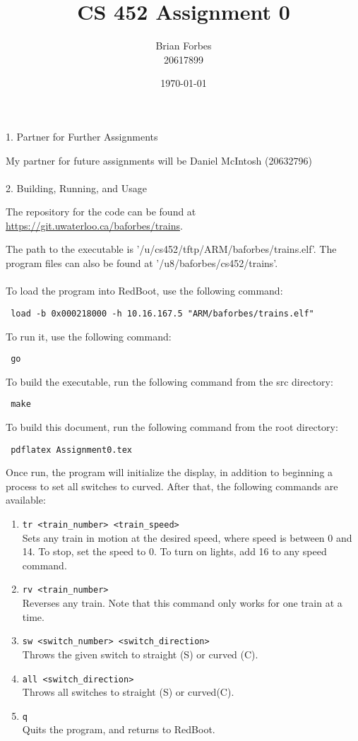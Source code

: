 \documentclass{article}
\begin{document}
\title{CS 452 Assignment 0}
\author{Brian Forbes \\ 20617899}
\date{\today}

\maketitle

{\huge 1. Partner for Further Assignments}

My partner for future assignments will be Daniel McIntosh (20632796)\\\\

{\huge 2. Building, Running, and Usage}

The repository for the code can be found at \url{https://git.uwaterloo.ca/baforbes/trains}. 

The path to the executable is '/u/cs452/tftp/ARM/baforbes/trains.elf'. The program files can also be found at '/u8/baforbes/cs452/trains'.\\\\
To load the program into RedBoot, use the following command: \begin{verbatim} load -b 0x000218000 -h 10.16.167.5 "ARM/baforbes/trains.elf" \end{verbatim}
To run it, use the following command: \begin{verbatim} go \end{verbatim}
To build the executable, run the following command from the src directory: \begin{verbatim} make \end{verbatim}
To build this document, run the following command from the root directory: \begin{verbatim} pdflatex Assignment0.tex \end{verbatim}

Once run, the program will initialize the display, in addition to beginning a process to set all switches to curved. After that, the following commands are available:
\begin{enumerate}
\item \verb|tr <train_number> <train_speed>|\\
    Sets any train in motion at the desired speed, where speed is between 0 and 14. To stop, set the speed to 0. To turn on lights, add 16 to any speed command.
\item \verb|rv <train_number>|\\
    Reverses any train. Note that this command only works for one train at a time.
\item \verb|sw <switch_number> <switch_direction>|\\
    Throws the given switch to straight (S) or curved (C).
\item \verb|all <switch_direction>|\\
    Throws all switches to straight (S) or curved(C).
\item \verb|q|\\
    Quits the program, and returns to RedBoot.
\end{enumerate}
\end{document}

